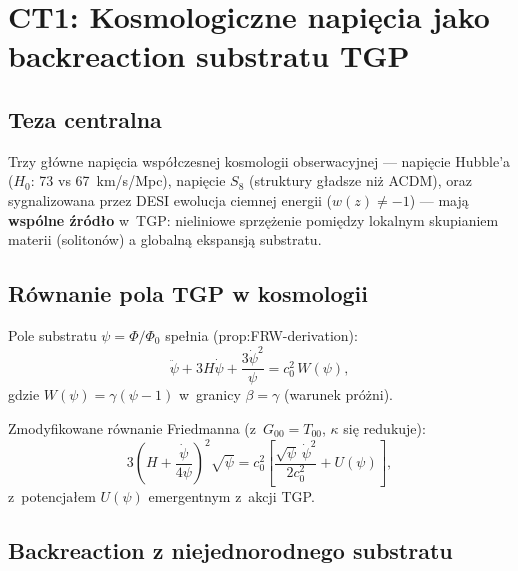 
\section*{CT1: Kosmologiczne napi\k{e}cia jako backreaction substratu TGP}%
%
\label{sec:CT1}

\subsection{Teza centralna}

Trzy g\l{}\'owne napi\k{e}cia wsp\'o\l{}czesnej kosmologii obserwacyjnej
--- napi\k{e}cie Hubble'a ($H_0$: 73 vs 67~km/s/Mpc),
napi\k{e}cie $S_8$ (struktury g\l{}adsze ni\.z ACDM),
oraz sygnalizowana przez DESI ewolucja ciemnej energii ($w(z) \neq -1$)
--- maj\k{a} \textbf{wsp\'olne \'zr\'od\l{}o} w~TGP:
nieliniowe sprz\k{e}\.zenie pomi\k{e}dzy lokalnym skupianiem materii (soliton\'ow)
a globaln\k{a} ekspansj\k{a} substratu.

\subsection{R\'ownanie pola TGP w kosmologii}

Pole substratu $\psi = \Phi/\Phi_0$ spe\l{}nia (prop:FRW-derivation):
\begin{equation}
  \ddot\psi + 3H\dot\psi + \frac{3\dot\psi^2}{\psi}
  = c_0^2\,W(\psi),
  \label{eq:CT1-field}
\end{equation}
gdzie $W(\psi) = \gamma(\psi - 1)$ w~granicy $\beta = \gamma$ (warunek pr\'o\.zni).

Zmodyfikowane r\'ownanie Friedmanna (z~$G_{00} = T_{00}$, $\kappa$ si\k{e} redukuje):
\begin{equation}
  3\!\left(H + \frac{\dot\psi}{4\psi}\right)^{\!2}\sqrt{\psi}
  = c_0^2\!\left[\frac{\sqrt\psi\,\dot\psi^2}{2c_0^2} + U(\psi)\right],
  \label{eq:CT1-friedmann}
\end{equation}
z~potencja\l{}em $U(\psi)$ emergentnym z~akcji TGP.

\subsection{Backreaction z niejednorodnego substratu}
\label{sec:CT1-backreaction}

